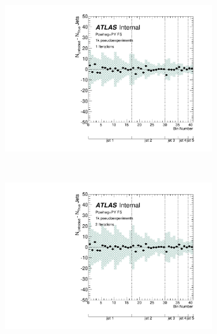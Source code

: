 \clearpage
\begin{figure}
\begin{subfigure}[]{0.5\textwidth}
\includegraphics[width=\textwidth]{fig/Stress/117050fullsim/Bias1Iterations.pdf}
\end{subfigure}
~
\begin{subfigure}[]{0.5\textwidth}
\includegraphics[width=\textwidth]{fig/Stress/117050fullsim/Bias2Iterations.pdf}
\end{subfigure}
\\
\begin{subfigure}[]{0.5\textwidth}

\end{subfigure}
\end{figure}
